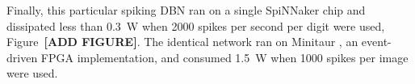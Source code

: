
Finally, this particular spiking DBN ran on a single SpiNNaker chip and dissipated less than 0.3~W when 2000 spikes per second per digit were used, Figure~\textbf{[ADD FIGURE]}. The identical network ran on Minitaur \citep{}, an event-driven FPGA implementation, and consumed 1.5~W when 1000 spikes per image were used.  


%
%
%
%
%
%
